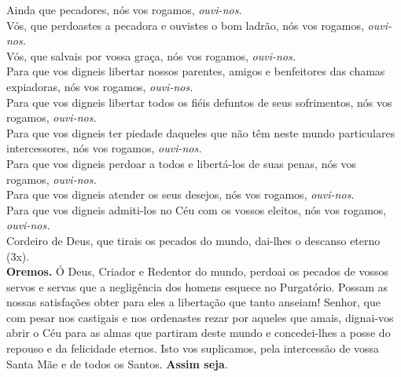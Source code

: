 Ainda que pecadores, nós vos rogamos, \textit{ouvi-nos.} \\
Vós, que perdoastes a pecadora e ouvistes o bom ladrão, nós vos rogamos, \textit{ouvi-nos.} \\
Vós, que salvais por vossa graça, nós vos rogamos, \textit{ouvi-nos.} \\
Para que vos digneis libertar nossos parentes, amigos e benfeitores das chamas expiadoras, nós vos rogamos, \textit{ouvi-nos.} \\
Para que vos digneis libertar todos os fiéis defuntos de seus sofrimentos, nós vos rogamos, \textit{ouvi-nos.} \\
Para que vos digneis ter piedade daqueles que não têm neste mundo particulares intercessores, nós vos rogamos, \textit{ouvi-nos.} \\
Para que vos digneis perdoar a todos e libertá-los de suas penas, nós vos rogamos, \textit{ouvi-nos.} \\
Para que vos digneis atender os seus desejos, nós vos rogamos, \textit{ouvi-nos.} \\
Para que vos digneis admiti-los no Céu com os vossos eleitos, nós vos rogamos, \textit{ouvi-nos.} \\


Cordeiro de Deus, que tirais os pecados do mundo, dai-lhes o descanso eterno (3x). \\


\textbf{Oremos.} Ó Deus, Criador e Redentor do mundo, perdoai os pecados de vossos servos e servas que a negligência dos homens esquece no Purgatório. Possam as nossas satisfações obter para eles a libertação que tanto anseiam! Senhor, que com pesar nos castigais e nos ordenastes rezar por aqueles que amais, dignai-vos abrir o Céu para as almas que partiram deste mundo e concedei-lhes a posse do repouso e da felicidade eternos. Isto vos suplicamos, pela intercessão de vossa Santa Mãe e de todos os Santos. \textbf{Assim seja}.
